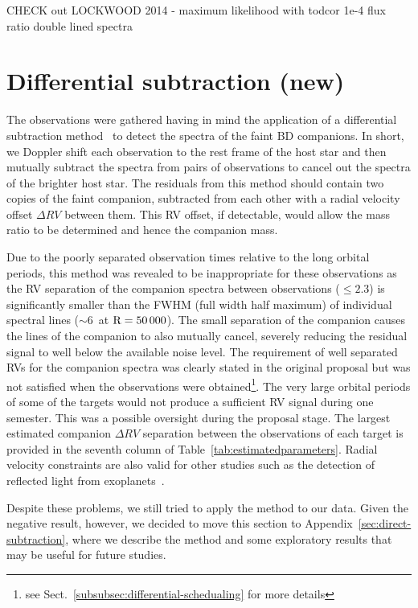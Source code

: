 CHECK out LOCKWOOD 2014 - maximum likelihood with todcor 1e-4 flux ratio double lined spectra


\section{Differential subtraction (new)}
\label{sec:spec_diff}

The observations were gathered having in mind the application of a differential subtraction method~\citep[e.g.][]{ferluga_separating_1997, kostogryz_spectral_2013} to detect the spectra of the faint BD companions. In short, we Doppler shift each observation to the rest frame of the host star and then mutually subtract the spectra from pairs of observations to cancel out the spectra of the brighter host star. The residuals from this method should contain two copies of the faint companion, subtracted from each other with a radial velocity offset \(\Delta RV\) between them. This RV offset, if detectable, would allow the mass ratio to be determined and hence the companion mass.

Due to the poorly separated observation times relative to the long orbital periods, this method was revealed to be inappropriate for these observations as the RV separation of the companion spectra between observations (\(\le 2.3\)\kmps{}) is significantly smaller than the FWHM (full width half maximum) of individual spectral lines (\(\sim\)6\kmps{}\ at \(\rm R=50\,000\)).  The small separation of the companion causes the lines of the companion to also mutually cancel, severely reducing the residual signal to well below the available noise level. The requirement of well separated RVs for the companion spectra was clearly stated in the original proposal but was not satisfied when the observations were obtained\footnote{see Sect.~\ref{subsubsec:differential-schedualing} for more details}. {\red{} The very large orbital periods of some of the targets would not produce a sufficient RV signal during one semester. This was a possible oversight during the proposal stage.} The largest estimated companion \(\Delta RV\) separation between the observations of each target is provided in the seventh column of Table~\ref{tab:estimatedparameters}. Radial velocity constraints are also valid for other studies such as the detection of reflected light from exoplanets~\cite{martins_evidence_2015}.

Despite these problems, we still tried to apply the method to our data. Given the negative result, however, we decided to move this section to Appendix~\ref{sec:direct-subtraction}, where we describe the method and some exploratory results that may be useful for future studies.


